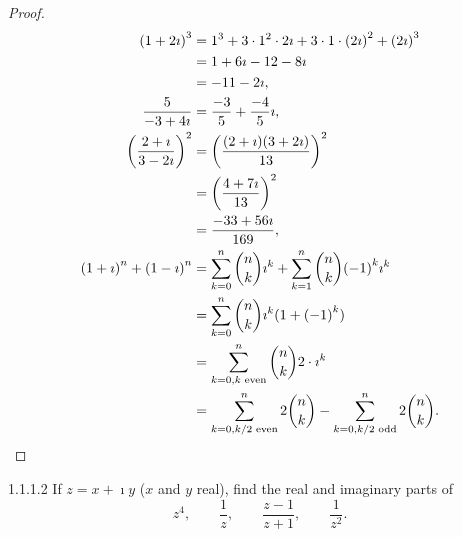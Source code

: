 \begin{proof}
	\begingroup
	\allowdisplaybreaks%
	\begin{align*}
		{(1 + 2\imath)}^{3}                                & = 1^{3} + 3\cdot 1^{2} \cdot 2\imath + 3\cdot 1 \cdot {(2\imath)}^{2} + {(2\imath)}^{3}                   \\
		                                                   & = 1 + 6\imath - 12 - 8\imath                                                                              \\
		                                                   & = -11 - 2\imath,                                                                                          \\
		\dfrac{5}{-3 + 4\imath}                            & = \dfrac{-3}{5} + \dfrac{-4}{5}\imath,                                                                    \\
		{\left(\dfrac{2 + \imath}{3 - 2\imath}\right)}^{2} & = {\left(\dfrac{(2 + \imath)(3 + 2\imath)}{13}\right)}^{2}                                                \\
		                                                   & = {\left(\dfrac{4 + 7\imath}{13}\right)}^{2}                                                              \\
		                                                   & = \dfrac{-33 + 56\imath}{169},                                                                            \\
		{(1 + \imath)}^{n} + {(1 - \imath)}^{n}            & = \sum^{n}_{k=0} \binom{n}{k} \imath^{k} + \sum^{n}_{k=1} \binom{n}{k} {(-1)}^{k}\imath^{k}               \\
		                                                   & = \sum^{n}_{k=0} \binom{n}{k} \imath^{k} (1 + {(-1)}^{k})                                                 \\
		                                                   & = \sum^{n}_{k=0, k \text{ even}} \binom{n}{k} 2\cdot\imath^{k}                                            \\
		                                                   & = \sum^{n}_{k=0, k/2 \text{ even}} 2\binom{n}{k} - \sum^{n}_{k=0, k/2 \text{ odd}} 2\binom{n}{k}.\qedhere
	\end{align*}
	\endgroup
\end{proof}

\begin{problem}{1.1.1.2}
If \( z = x + \imath y \) (\( x \) and \( y \) real), find the real and imaginary parts of
\[
	z^{4},\qquad \dfrac{1}{z}, \qquad \dfrac{z - 1}{z + 1}, \qquad \dfrac{1}{z^{2}}.
\]
\end{problem}

